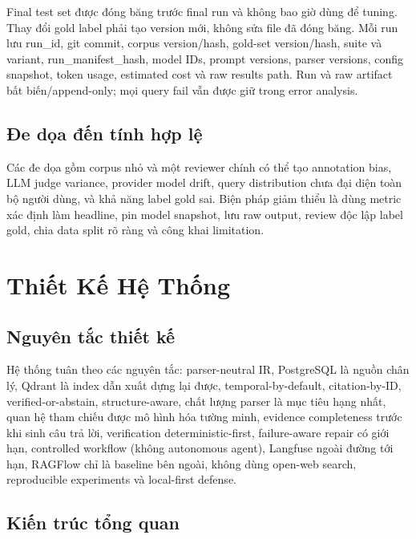 \documentclass[a4paper,12pt]{extreport}
\begin{document}
Final test set được đóng băng trước final run và không bao giờ dùng để tuning. Thay đổi gold label phải tạo version mới, không sửa file đã đóng băng. Mỗi run lưu run\_id, git commit, corpus version/hash, gold-set version/hash, suite và variant, run\_manifest\_hash, model IDs, prompt versions, parser versions, config snapshot, token usage, estimated cost và raw results path. Run và raw artifact bất biến/append-only; mọi query fail vẫn được giữ trong error analysis.

\section{Đe dọa đến tính hợp lệ}

Các đe dọa gồm corpus nhỏ và một reviewer chính có thể tạo annotation bias, LLM judge variance, provider model drift, query distribution chưa đại diện toàn bộ người dùng, và khả năng label gold sai. Biện pháp giảm thiểu là dùng metric xác định làm headline, pin model snapshot, lưu raw output, review độc lập label gold, chia data split rõ ràng và công khai limitation.

\chapter{Thiết Kế Hệ Thống}

\section{Nguyên tắc thiết kế}

Hệ thống tuân theo các nguyên tắc: parser-neutral IR, PostgreSQL là nguồn chân lý, Qdrant là index dẫn xuất dựng lại được, temporal-by-default, citation-by-ID, verified-or-abstain, structure-aware, chất lượng parser là mục tiêu hạng nhất, quan hệ tham chiếu được mô hình hóa tường minh, evidence completeness trước khi sinh câu trả lời, verification deterministic-first, failure-aware repair có giới hạn, controlled workflow (không autonomous agent), Langfuse ngoài đường tới hạn, RAGFlow chỉ là baseline bên ngoài, không dùng open-web search, reproducible experiments và local-first defense.

\section{Kiến trúc tổng quan}
\end{document}
